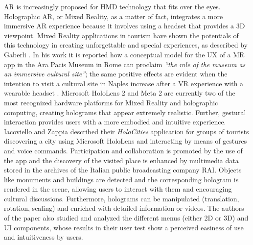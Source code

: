 AR is increasingly proposed for HMD technology that fits over the eyes. Holographic AR, or Mixed Reality, as a matter of fact, integrates a more immersive AR experience because it involves using a headset that provides a 3D viewpoint.
Mixed Reality applications in tourism have shown the potentials of this technology in creating unforgettable and special experiences, as described by Gaberli \cite{gaberli_tourism_2019}. In his work it is reported how a conceptual model for the UX of a MR app in the Ara Pacis Museum \cite{jung_impact_2020} in Rome can proclaim \textit{“the role of the museum as an immersive cultural site”}; the same positive effects are evident when the intention to visit a cultural site in Naples increase after a VR experience with a wearable headset \cite{marasco2018exploring}.
Microsoft HoloLens 2 and Meta 2 are currently two of the most recognized hardware platforms for Mixed Reality and holographic computing, creating holograms that appear extremely realistic. Further, gestural interaction provides users with a more embodied and intuitive experience. 
Iacoviello and Zappia \cite{iacoviello_holocities_2020} described their \textit{HoloCities} application for groups of tourists discovering a city using Microsoft HoloLens and interacting by means of gestures and voice commands. Participation and collaboration is promoted by the use of the app and the discovery of the visited place is enhanced by multimedia data stored in the archives of the Italian public broadcasting company RAI. Objects like monuments and buildings are detected and the corresponding hologram is rendered in the scene, allowing users to interact with them and encouraging cultural discussions. Furthermore, holograms can be manipulated (translation, rotation, scaling) and enriched with detailed information or videos.
The authors of the paper also studied and analyzed the different menus (either 2D or 3D) and UI components, whose results in their user test show a perceived easiness of use and intuitiveness by users.

